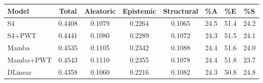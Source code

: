 \begin{tabular}{lccccccc}
\toprule
Model & Total & Aleatoric & Epistemic & Structural & \%A & \%E & \%S \\
\midrule
S4 & 0.4408 & 0.1079 & 0.2264 & 0.1065 & 24.5 & 51.4 & 24.2 \\
S4+PWT & 0.4441 & 0.1080 & 0.2289 & 0.1072 & 24.3 & 51.5 & 24.1 \\
Mamba & 0.4535 & 0.1105 & 0.2342 & 0.1088 & 24.4 & 51.6 & 24.0 \\
Mamba+PWT & 0.4543 & 0.1110 & 0.2355 & 0.1078 & 24.4 & 51.8 & 23.7 \\
DLinear & 0.4358 & 0.1060 & 0.2216 & 0.1082 & 24.3 & 50.8 & 24.8 \\
\bottomrule
\end{tabular}